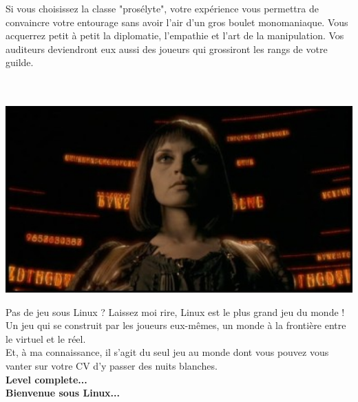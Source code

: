 \documentclass[11pt,twoside,a4paper]{article}
\begin{document}
Si vous choisissez la classe "pros{\'e}lyte", votre exp{\'e}rience vous permettra de convaincre votre entourage sans avoir l'air d'un gros boulet monomaniaque. Vous acquerrez petit {\`a} petit la diplomatie, l'empathie et l'art de la manipulation. Vos auditeurs deviendront eux aussi des joueurs qui grossiront les rangs de votre guilde.~\\~\\~\\

\begin{minipage}[ht]{14.10cm}
	\includegraphics[width=14.05cm]{img/avalon_final.jpg}
\end{minipage} \hfill \begin{minipage}[ht]{0.30\textwidth}
	Pas de jeu sous Linux ? Laissez moi rire, Linux est le plus grand jeu du monde ! Un jeu qui se construit par les joueurs eux-m{\^e}mes, un monde {\`a} la fronti{\`e}re entre le virtuel et le r{\'e}el.~\\
	Et, {\`a} ma connaissance, il s'agit du seul jeu au monde dont vous pouvez vous vanter sur votre CV d'y passer des nuits blanches.~\\

	\textbf{Level complete...}~\\

	\textbf{Bienvenue sous Linux...}~\\
\end{minipage}~\\
\end{document}
